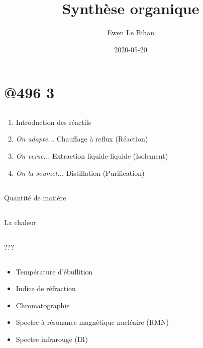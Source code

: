 \documentclass{article}
\title{Synthèse organique}
\date{2020-05-20}
\author{Ewen Le Bihan}
\begin{document}
\maketitle

\section{@496 3}
\subsection{}

\begin{enumerate}
	\item Introduction des réactifs
	\item \emph{On adapte...} Chauffage à reflux (Réaction)
	\item \emph{On verse...} Extraction liquide-liquide (Isolement)
	\item \emph{On la soumet...} Distillation (Purification)
\end{enumerate}

\subsection{}

Quantité de matière

\subsection{}

La chaleur

\subsection{}

???

\subsection{}

\begin{itemize}
	\item Température d'ébullition
	\item Indice de réfraction
	\item Chromatographie
	\item Spectre à résonance magnétique nucléaire (RMN)
	\item Spectre infrarouge (IR)
\end{itemize}
\end{document}
